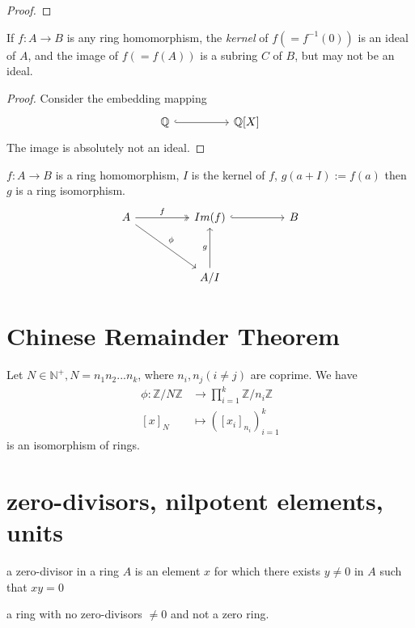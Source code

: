 \documentclass[11pt,fleqn]{book} %
\begin{document}
\begin{CJK}{UTF8}{gkai}
\begin{proof}
\end{proof}

\begin{corollary}
	If $f: A\to B$ is any ring homomorphism, the {\it kernel} of $f(=f^{-1}(0))$ is an ideal of $A$, and the image of $f (= f(A))$ is a subring $C$ of $B$, but may not be an ideal.
\end{corollary}
\begin{proof}
	Consider the embedding mapping\[\begin{tikzcd}
		{\mathbb{Q} } && {\mathbb{Q}[X]}
		\arrow[hook, from=1-1, to=1-3]
	\end{tikzcd}\]
	The image is absolutely not an ideal.
\end{proof}

\begin{theorem}
	 $f: A \to B$ is a ring homomorphism, $I$ is the kernel of $f$, $g(a + I) := f(a)$ then $g$ is a ring isomorphism.
	\[\begin{tikzcd}
		A && {Im(f)} && B \\
		\\
		&& {A/I}
		\arrow["f", two heads, from=1-1, to=1-3]
		\arrow[hook, from=1-3, to=1-5]
		\arrow["g", from=3-3, to=1-3]
		\arrow["\phi", from=1-1, to=3-3]
	\end{tikzcd}\]

\end{theorem}

\section{Chinese Remainder Theorem}
\begin{theorem}
	Let $N \in \mathbb{N}^+, N = n_1n_2...n_k$, where $n_i,n_j (i \neq j)$ are coprime. We have 
	\begin{align*}
	\phi:  \mathbb{Z}/N\mathbb{Z} &\to \prod_{i = 1}^{k}\mathbb{Z}/n_i\mathbb{Z}\\
	 [x]_N &\mapsto ([x_i]_{n_i})_{i=1}^k
	\end{align*}
	is an isomorphism of rings.
\end{theorem}

\section{zero-divisors, nilpotent elements, units}
\begin{definition}
	 a zero-divisor in a ring $A$ is an element $x$ for which there exists $y \neq 0$ in $A$ such that $xy = 0$
\end{definition}
\begin{definition}
	 a ring with no zero-divisors $\neq 0$ and not a zero ring.
\end{definition}


\end{CJK}
\end{document}
